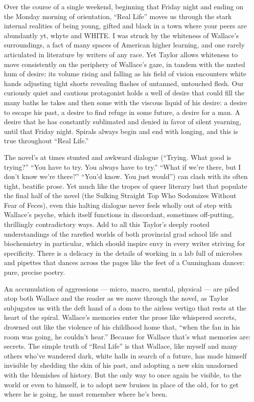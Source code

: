 Over the course of a single weekend, beginning that Friday night and
ending on the Monday morning of orientation, ``Real Life'' moves us
through the stark internal realities of being young, gifted and black in
a town where your peers are abundantly yt, whyte and WHITE. I was struck
by the whiteness of Wallace's surroundings, a fact of many spaces of
American higher learning, and one rarely articulated in literature by
writers of any race. Yet Taylor allows whiteness to move consistently on
the periphery of Wallace's gaze, in tandem with the muted hum of desire:
its volume rising and falling as his field of vision encounters white
hands adjusting tight shorts revealing flashes of untanned, untouched
flesh. Our curiously quiet and cautious protagonist holds a well of
desire that could fill the many baths he takes and then some with the
viscous liquid of his desire: a desire to escape his past, a desire to
find refuge in some future, a desire for a man. A desire that he has
constantly sublimated and denied in favor of silent yearning, until that
Friday night. Spirals always begin and end with longing, and this is
true throughout ``Real Life.''

The novel's at times stunted and awkward dialogue (``Trying. What good
is trying?'' ``You have to try. You always have to try.'' ``What if
we're there, but I don't know we're there?'' ``You'd know. You just
would'') can clash with its often tight, beatific prose. Yet much like
the tropes of queer literary lust that populate the final half of the
novel (the Sulking Straight Top Who Sodomizes Without Fear of Feces),
even this halting dialogue never feels wholly out of step with Wallace's
psyche, which itself functions in discordant, sometimes off-putting,
thrillingly contradictory ways. Add to all this Taylor's deeply rooted
understandings of the rarefied worlds of both provincial grad school
life and biochemistry in particular, which should inspire envy in every
writer striving for specificity. There is a delicacy in the details of
working in a lab full of microbes and pipettes that dances across the
pages like the feet of a Cunningham dancer: pure, precise poetry.

An accumulation of aggressions --- micro, macro, mental, physical ---
are piled atop both Wallace and the reader as we move through the novel,
as Taylor subjugates us with the deft hand of a dom to the airless
vertigo that rests at the heart of the spiral. Wallace's memories enter
the prose like whispered secrets, drowned out like the violence of his
childhood home that, ``when the fan in his room was going, he couldn't
hear.'' Because for Wallace that's what memories are: secrets. The
simple truth of ``Real Life'' is that Wallace, like myself and many
others who've wandered dark, white halls in search of a future, has made
himself invisible by shedding the skin of his past, and adopting a new
skin unadorned with the blemishes of history. But the only way to once
again be visible, to the world or even to himself, is to adopt new
bruises in place of the old, for to get where he is going, he must
remember where he's been.

